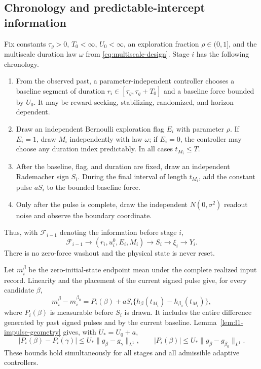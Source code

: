 \subsection{Chronology and predictable-intercept information}

Fix constants \(\tau_g>0\), \(T_0<\infty\), \(U_0<\infty\), an exploration
fraction \(\rho\in(0,1]\), and the multiscale duration law \(\omega\) from
\eqref{eq:multiscale-design}.  Stage \(i\) has the following chronology.

\begin{enumerate}
\item From the observed past, a parameter-independent controller chooses a
baseline segment of duration \(r_i\in[\tau_g,\tau_g+T_0]\) and a baseline
force bounded by \(U_0\).  It may be reward-seeking, stabilizing, randomized,
and horizon dependent.
\item Draw an independent Bernoulli exploration flag \(E_i\) with parameter
\(\rho\).  If \(E_i=1\), draw \(M_i\) independently with law \(\omega\); if
\(E_i=0\), the controller may choose any duration index predictably.  In all
cases \(t_{M_i}\le T\).
\item After the baseline, flag, and duration are fixed, draw an independent
Rademacher sign \(S_i\).  During the final interval of length \(t_{M_i}\),
add the constant pulse \(aS_i\) to the bounded baseline force.
\item Only after the pulse is complete, draw the independent
\(N(0,\sigma^2)\) readout noise and observe the boundary coordinate.
\end{enumerate}
Thus, with \(\mathcal F_{i-1}\) denoting the information before stage \(i\),
\begin{equation}
 \mathcal F_{i-1}\longrightarrow(r_i,u_i^0,E_i,M_i)
 \longrightarrow S_i\longrightarrow\xi_i\longrightarrow Y_i.
 \label{eq:linear-time-chronology}
\end{equation}
There is no zero-force washout and the physical state is never reset.

Let \(m_i^\beta\) be the zero-initial-state endpoint mean under the complete
realized input record.  Linearity and the placement of the current signed
pulse give, for every candidate \(\beta\),
\begin{equation}
 m_i^\beta-m_i^{\beta_0}
 =P_i(\beta)+aS_i
 \{h_\beta(t_{M_i})-h_{\beta_0}(t_{M_i})\},
 \label{eq:predictable-intercept-decomposition}
\end{equation}
where \(P_i(\beta)\) is measurable before \(S_i\) is drawn.  It includes the
entire difference generated by past signed pulses and by the current
baseline.  Lemma~\ref{lem:l1-impulse-geometry} gives, with
\(U_*=U_0+a\),
\begin{equation}
 |P_i(\beta)-P_i(\gamma)|
 \le U_*\|g_\beta-g_\gamma\|_{L^1},
 \qquad
 |P_i(\beta)|\le U_*\|g_\beta-g_{\beta_0}\|_{L^1}.
 \label{eq:predictable-intercept-continuity}
\end{equation}
These bounds hold simultaneously for all stages and all admissible adaptive
controllers.

